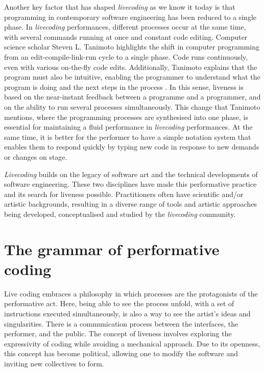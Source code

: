 \documentclass[12pt, twoside, a4paper]{report}
\begin{document}
Another key factor that has shaped \textit{livecoding} as we know it today is that programming in contemporary software engineering has been reduced to a single phase. In \textit{livecoding} performances, different processes occur at the same time, with several commands running at once and constant code editing. Computer science scholar Steven L. Tanimoto highlights the shift in computer programming from an edit-compile-link-run cycle to a single phase. Code runs continuously, even with various on-the-fly code edits. Additionally, Tanimoto explains that the program must also be intuitive, enabling the programmer to understand what the program is doing and the next steps in the process \citep{tanimoto1990viva}. In this sense, liveness is based on the near-instant feedback between a programme and a programmer, and on the ability to run several processes simultaneously. This change that Tanimoto mentions, where the programming processes are synthesised into one phase, is essential for maintaining a fluid performance in \textit{livecoding} performances. At the same time, it is better for the performer to have a simple notation system that enables them to respond quickly by typing new code in response to new demands or changes on stage. 

\textit{Livecoding} builds on the legacy of software art and the technical developments of software engineering. These two disciplines have made this performative practice and its search for liveness possible. Practitioners often have scientific and/or artistic backgrounds, resulting in a diverse range of tools and artistic approaches being developed, conceptualised and studied by the \textit{livecoding} community.

%

\section{The grammar of performative coding}


Live coding embraces a philosophy in which processes are the protagonists of the
performative act. Here, being able to see the process unfold, with a set of instructions
executed simultaneously, is also a way to see the artist's ideas and singularities.
There is a communication process between the interfaces, the performer, and the
public. The concept of liveness involves exploring the expressivity of coding while avoiding
a mechanical approach. Due to its openness, this concept has become political,
allowing one to modify the software and inviting new collectives to form. 
\end{document}
